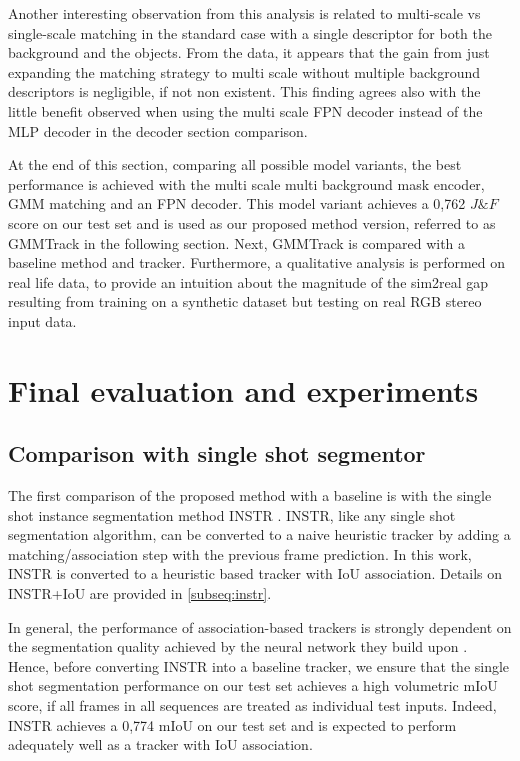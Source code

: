 Another interesting observation from this analysis is related to multi-scale vs single-scale matching in the standard case with a single descriptor for both the background and the objects. From the data, it appears that the gain from just expanding the matching strategy to multi scale without multiple background descriptors is negligible, if not non existent. This finding agrees also with the little benefit observed when using the multi scale FPN decoder instead of the MLP decoder in the decoder section comparison. \par

At the end of this section, comparing all possible model variants, the best performance is achieved with the multi scale multi background mask encoder, GMM matching and an FPN decoder. This model variant achieves  a 0,762 $J\&F$ score on our test set and is used as our proposed method version, referred to as GMMTrack in the following section. Next, GMMTrack is compared with a baseline method and tracker. Furthermore, a qualitative analysis is performed on real life data, to provide an intuition about the magnitude of the sim2real gap resulting from training on a synthetic dataset but testing on real RGB stereo input data. 

\section{Final evaluation and experiments}
\subsection{Comparison with single shot segmentor}

The first comparison of the proposed method with a baseline is with the single shot instance segmentation method INSTR \parencite{durner2021unknown}. INSTR, like any single shot segmentation algorithm, can be converted to a naive heuristic tracker by adding a matching/association step with the previous frame prediction. In this work, INSTR is converted to a heuristic based tracker with IoU association. Details on INSTR+IoU are provided in \autoref{subseq:instr}.\par
In general, the performance of association-based trackers is strongly dependent on the segmentation quality achieved by the neural network they build upon \parencite{sort}. Hence, before converting INSTR into a baseline tracker, we ensure that the single shot segmentation performance on our test set achieves a high volumetric mIoU score, if all frames in all sequences are treated as individual test inputs. Indeed, INSTR achieves a 0,774 mIoU on our test set and is expected to perform adequately well as a tracker with IoU association. \par

